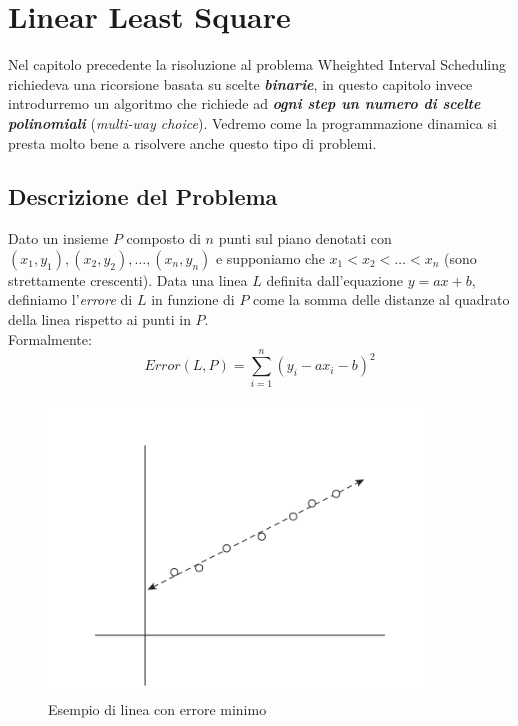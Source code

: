 \chapter{Linear Least Square}

Nel capitolo precedente la risoluzione al problema Wheighted Interval
Scheduling richiedeva una ricorsione basata su scelte
\textbf{\emph{binarie}}, in questo capitolo invece introdurremo un
algoritmo che richiede ad \textbf{\emph{ogni step un numero di scelte
    polinomiali}} (\emph{multi-way choice}). Vedremo come la programmazione
dinamica si presta molto bene a risolvere anche questo tipo di problemi.

\section{Descrizione del Problema}

\begin{myblockquote}
  Dato un insieme $P$ composto di $n$ punti sul piano denotati con \linebreak
  $(x_1, y_1), (x_2, y_2), \ldots, (x_n, y_n)$ e supponiamo che
  $x_1 < x_2 < \ldots < x_n$ (sono strettamente crescenti). Data una
  linea $L$ definita dall'equazione $y = ax + b$, definiamo
  l'\emph{errore} di $L$ in funzione di $P$ come la somma delle
  distanze al quadrato della linea rispetto ai punti in $P$.\\

  Formalmente:
  \begin{equation*}
    Error(L, P) = \sum_{i=1}^{n} (y_i - ax_i - b)^2
  \end{equation*}
\end{myblockquote}

\begin{figure}[H]
  \centering
  \includegraphics[width = 10cm, keepaspectratio]{capitoli/programmazione_dinamica/imgs/best_fit.png}
  \caption{Esempio di linea con errore minimo}
\end{figure}

